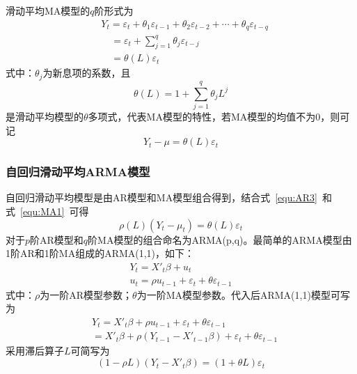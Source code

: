 滑动平均MA模型的$q$阶形式为
\begin{align}
  \label{equ:mama}
  & {{Y}_{t}}={{\varepsilon }_{t}}+{{\theta }_{1}}{{\varepsilon }_{t-1}}+{{\theta }_{2}}{{\varepsilon }_{t-2}}+\cdots +{{\theta }_{q}}{{\varepsilon }_{t-q}} \nonumber \\ 
 & \quad ={{\varepsilon }_{t}}+\sum\limits_{j=1}^{q}{{{\theta }_{j}}{{\varepsilon }_{t-j}}} \\ 
 & \quad =\theta (L){{\varepsilon }_{t}} \nonumber
\end{align}
式中：${\theta }_{j}$为新息项的系数，且
\begin{equation}
	\theta (L)=1+\sum\limits_{j=1}^{q}{{{\theta }_{j}}{{L}^{j}}}
\end{equation}
是滑动平均模型的${\theta }$多项式，代表MA模型的特性，若MA模型的均值不为0，则可记
\begin{equation}
	\label{equ:MA1}
	{{Y}_{t}}-\mu =\theta (L){{\varepsilon }_{t}}
\end{equation}

\subsubsection{自回归滑动平均ARMA模型}

自回归滑动平均模型是由AR模型和MA模型组合得到，结合式~\ref{equ:AR3}~和式~\ref{equ:MA1}~可得
\begin{equation}
	\rho (L)({{Y}_{t}}-{{\mu }_{t}})=\theta (L){{\varepsilon }_{t}}
\end{equation}
对于$p$阶AR模型和$q$阶MA模型的组合命名为ARMA(p,q)。最简单的ARMA模型由1阶AR和1阶MA组成的ARMA(1,1)，如下：
\begin{gather}
 	{{Y}_{t}}={{{{X}'}}_{t}}\beta +{{u}_{t}} \\ 
	{{u}_{t}}=\rho {{u}_{t-1}}+{{\varepsilon }_{t}}+\theta {{\varepsilon }_{t-1}}
\end{gather}
式中：$\rho$为一阶AR模型参数；$\theta$为一阶MA模型参数。代入后ARMA(1,1)模型可写为
\begin{align}
  & {{Y}_{t}}={{{{X}'}}_{t}}\beta +\rho {{u}_{t-1}}+{{\varepsilon }_{t}}+\theta {{\varepsilon }_{t-1}} \\ 
 & ={{{{X}'}}_{t}}\beta +\rho ({{Y}_{t-1}}-{{{{X}'}}_{t-1}}\beta )+{{\varepsilon }_{t}}+\theta {{\varepsilon }_{t-1}}
\end{align}
采用滞后算子$L$可简写为
\begin{equation}
	(1-\rho L)({{Y}_{t}}-{{{X}'}_{t}}\beta )=(1+\theta L){{\varepsilon }_{t}}
\end{equation}

